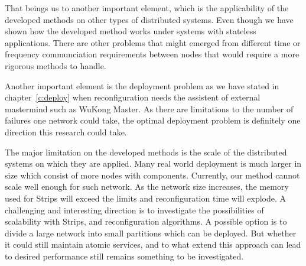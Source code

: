 That beings us to another important element, which is the applicability of the developed methods on other types of distributed systems. Even though we have shown how the developed method works under systems with stateless applications. There are other problems that might emerged from different time or frequency communciation requirements between nodes that would require a more rigorous methods to handle.

Another important element is the deployment problem as we have stated in chapter~\ref{c:deploy} when reconfiguration needs the assistent of external mastermind such as WuKong Master. As there are limitations to the number of failures one network could take, the optimal deployment problem is definitely one direction this research could take. 

The major limitation on the developed methods is the scale of the distributed systems on which they are applied. Many real world deployment is much larger in size which consist of more nodes with components. Currently, our method cannot scale well enough for such network. As the network size increases, the memory used for Strips will exceed the limits and reconfiguration time will explode. A challenging and interesting direction is to investigate the possibilities of scalability with Strips, and reconfiguration algorithms. A possible option is to divide a large network into small partitions which can be deployed. But whether it could still maintain atomic services, and to what extend this approach can lead to desired performance still remains something to be investigated.

